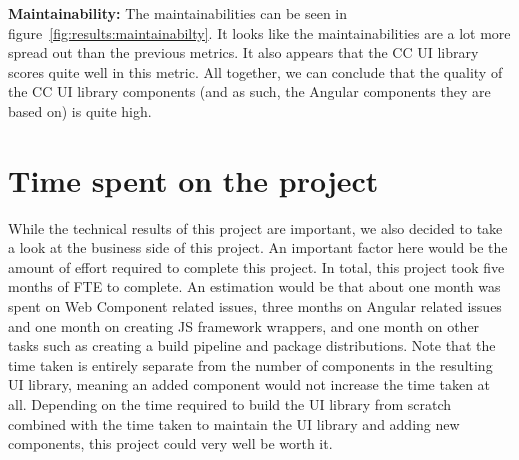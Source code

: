 \textbf{Maintainability:} The maintainabilities can be seen in figure~\ref{fig:results:maintainabilty}. It looks like the maintainabilities are a lot more spread out than the previous metrics. It also appears that the CC UI library scores quite well in this metric. All together, we can conclude that the quality of the CC UI library components (and as such, the Angular components they are based on) is quite high.

\section{Time spent on the project}\label{sec:results:time-spent}
While the technical results of this project are important, we also decided to take a look at the business side of this project. An important factor here would be the amount of effort required to complete this project. In total, this project took five months of FTE to complete. An estimation would be that about one month was spent on Web Component related issues, three months on Angular related issues and one month on creating JS framework wrappers, and one month on other tasks such as creating a build pipeline and package distributions. Note that the time taken is entirely separate from the number of components in the resulting UI library, meaning an added component would not increase the time taken at all. Depending on the time required to build the UI library from scratch combined with the time taken to maintain the UI library and adding new components, this project could very well be worth it.